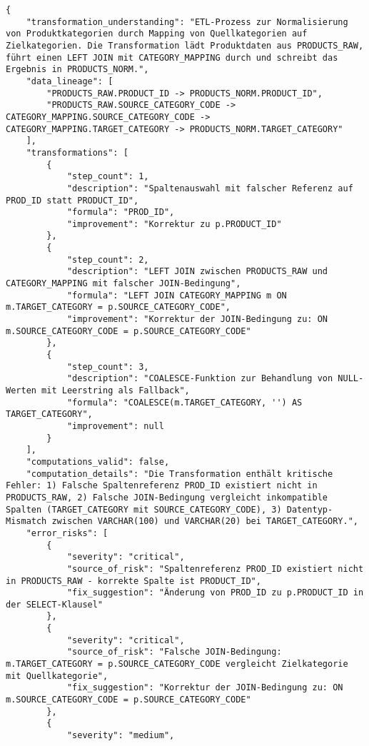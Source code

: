 \begin{lstlisting}[caption={Ausgabe: Claude Sonnet 4 Anwendungsfall 6 Hauptdurchlauf},label={claude_case6_prompt1}]
{
    "transformation_understanding": "ETL-Prozess zur Normalisierung von Produktkategorien durch Mapping von Quellkategorien auf Zielkategorien. Die Transformation lädt Produktdaten aus PRODUCTS_RAW, führt einen LEFT JOIN mit CATEGORY_MAPPING durch und schreibt das Ergebnis in PRODUCTS_NORM.",
    "data_lineage": [
        "PRODUCTS_RAW.PRODUCT_ID -> PRODUCTS_NORM.PRODUCT_ID",
        "PRODUCTS_RAW.SOURCE_CATEGORY_CODE -> CATEGORY_MAPPING.SOURCE_CATEGORY_CODE -> CATEGORY_MAPPING.TARGET_CATEGORY -> PRODUCTS_NORM.TARGET_CATEGORY"
    ],
    "transformations": [
        {
            "step_count": 1,
            "description": "Spaltenauswahl mit falscher Referenz auf PROD_ID statt PRODUCT_ID",
            "formula": "PROD_ID",
            "improvement": "Korrektur zu p.PRODUCT_ID"
        },
        {
            "step_count": 2,
            "description": "LEFT JOIN zwischen PRODUCTS_RAW und CATEGORY_MAPPING mit falscher JOIN-Bedingung",
            "formula": "LEFT JOIN CATEGORY_MAPPING m ON m.TARGET_CATEGORY = p.SOURCE_CATEGORY_CODE",
            "improvement": "Korrektur der JOIN-Bedingung zu: ON m.SOURCE_CATEGORY_CODE = p.SOURCE_CATEGORY_CODE"
        },
        {
            "step_count": 3,
            "description": "COALESCE-Funktion zur Behandlung von NULL-Werten mit Leerstring als Fallback",
            "formula": "COALESCE(m.TARGET_CATEGORY, '') AS TARGET_CATEGORY",
            "improvement": null
        }
    ],
    "computations_valid": false,
    "computation_details": "Die Transformation enthält kritische Fehler: 1) Falsche Spaltenreferenz PROD_ID existiert nicht in PRODUCTS_RAW, 2) Falsche JOIN-Bedingung vergleicht inkompatible Spalten (TARGET_CATEGORY mit SOURCE_CATEGORY_CODE), 3) Datentyp-Mismatch zwischen VARCHAR(100) und VARCHAR(20) bei TARGET_CATEGORY.",
    "error_risks": [
        {
            "severity": "critical",
            "source_of_risk": "Spaltenreferenz PROD_ID existiert nicht in PRODUCTS_RAW - korrekte Spalte ist PRODUCT_ID",
            "fix_suggestion": "Änderung von PROD_ID zu p.PRODUCT_ID in der SELECT-Klausel"
        },
        {
            "severity": "critical",
            "source_of_risk": "Falsche JOIN-Bedingung: m.TARGET_CATEGORY = p.SOURCE_CATEGORY_CODE vergleicht Zielkategorie mit Quellkategorie",
            "fix_suggestion": "Korrektur der JOIN-Bedingung zu: ON m.SOURCE_CATEGORY_CODE = p.SOURCE_CATEGORY_CODE"
        },
        {
            "severity": "medium",

\end{lstlisting}
